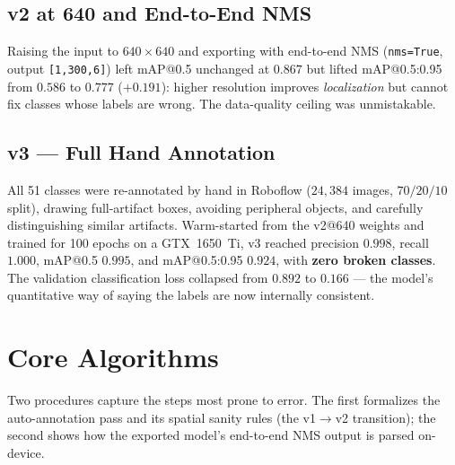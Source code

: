 \subsection{v2 at 640 and End-to-End NMS}
Raising the input to $640\times640$ and exporting with end-to-end NMS
(\texttt{nms=True}, output \texttt{[1,300,6]}) left mAP@0.5 unchanged at $0.867$ but
lifted mAP@0.5:0.95 from $0.586$ to $0.777$ ($+0.191$): higher resolution improves
\emph{localization} but cannot fix classes whose labels are wrong. The data-quality
ceiling was unmistakable.

\subsection{v3 --- Full Hand Annotation}
All 51 classes were re-annotated by hand in Roboflow ($24{,}384$ images,
$70/20/10$ split), drawing full-artifact boxes, avoiding peripheral objects, and
carefully distinguishing similar artifacts. Warm-started from the v2@640 weights and
trained for 100 epochs on a GTX~1650~Ti, v3 reached precision $0.998$, recall $1.000$,
mAP@0.5 $0.995$, and mAP@0.5:0.95 $0.924$, with \textbf{zero broken classes}. The
validation classification loss collapsed from $0.892$ to $0.166$ --- the model's
quantitative way of saying the labels are now internally consistent.

\section{Core Algorithms}

Two procedures capture the steps most prone to error. The first formalizes the
auto-annotation pass and its spatial sanity rules (the v1$\rightarrow$v2 transition);
the second shows how the exported model's end-to-end NMS output is parsed on-device.

\begin{algorithm}[htbp]
\caption{Auto-annotation with spatial sanity rules (v1$\rightarrow$v2)}
\end{algorithm}

